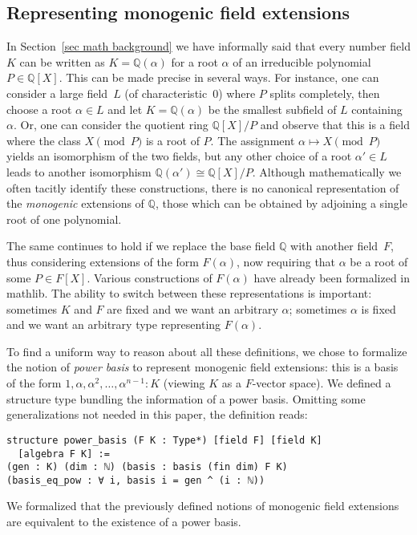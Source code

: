 \documentclass[sn-mathphys]{sn-jnl}%
\newcommand{\mathlib}{\textsf{mathlib}\xspace}
\newcommand{\QQ}{\mathbb{Q}}
\begin{document}
\subsection{Representing monogenic field extensions} \label{sec:monogenic-field-extension}

In Section~\ref{sec math background} we have informally said that every number field $K$ can be written as $K=\QQ(\alpha)$ for a root $\alpha$ of an irreducible polynomial $P\in\QQ[X]$. This can be made precise in several ways. For instance, one can consider a large field~$L$ (of characteristic~$0$) where $P$ splits completely, then choose a root $\alpha\in L$ and let $K = \QQ(\alpha)$ be the smallest subfield of $L$ containing $\alpha$. Or, one can consider the quotient ring $\QQ[X]/P$ and observe that this is a field where the class $X\pmod{P}$ is a root of $P$. The assignment $\alpha\mapsto X\pmod{P}$ yields an isomorphism of the two fields, but any other choice of a root $\alpha'\in L$ leads to another isomorphism $\QQ(\alpha')\cong \QQ[X]/P$. Although mathematically we often tacitly identify these constructions, there is no canonical representation of the \emph{monogenic} extensions of $\QQ$, those which can be obtained by adjoining a single root of one polynomial.

The same continues to hold if we replace the base field $\QQ$ with another field~$F$, thus considering extensions of the form $F(\alpha)$, now requiring that $\alpha$ be a root of some $P\in F[X]$. Various constructions of $F(\alpha)$ have already been formalized in \mathlib. The ability to switch between these representations is important: sometimes $K$ and $F$ are fixed and we want an arbitrary $\alpha$; sometimes $\alpha$ is fixed and we want an arbitrary type representing $F(\alpha)$.

To find a uniform way to reason about all these definitions,
we chose to formalize the notion of \emph{power basis} to represent monogenic field extensions: this is a basis of the form $1, \alpha, \alpha^2, \dots, \alpha^{n-1} : K$ (viewing $K$ as a $F$-vector space).
We defined a structure type bundling the information of a power basis.
Omitting some generalizations not needed in this paper, the definition reads:
\begin{lstlisting}
structure power_basis (F K : Type*) [field F] [field K]
  [algebra F K] :=
(gen : K) (dim : ℕ) (basis : basis (fin dim) F K)
(basis_eq_pow : ∀ i, basis i = gen ^ (i : ℕ))
\end{lstlisting}
We formalized that the previously defined notions of monogenic field extensions are equivalent to the existence of a power basis.
\end{document}
